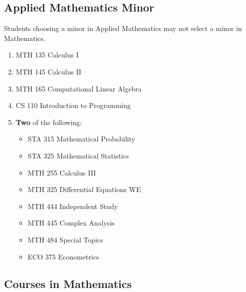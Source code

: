 \documentclass[
  letterpaper,
]{scrbook}
\providecommand{\tightlist}{%
  \setlength{\itemsep}{0pt}\setlength{\parskip}{0pt}}
\begin{document}
\subsection{Applied Mathematics Minor}\label{applied-mathematics-minor}

Students choosing a minor in Applied Mathematics may not select a minor
in Mathematics.

\begin{enumerate}
\def\labelenumi{\arabic{enumi}.}
\tightlist
\item
  MTH 135 Calculus I\\
\item
  MTH 145 Calculus II\\
\item
  MTH 165 Computational Linear Algebra\\
\item
  CS 110 Introduction to Programming\\
\item
  \textbf{Two} of the following:

  \begin{itemize}
  \tightlist
  \item
    STA 315 Mathematical Probability\\
  \item
    STA 325 Mathematical Statistics\\
  \item
    MTH 255 Calculus III\\
  \item
    MTH 325 Differential Equations WE\\
  \item
    MTH 444 Independent Study\\
  \item
    MTH 445 Complex Analysis\\
  \item
    MTH 484 Special Topics\\
  \item
    ECO 375 Econometrics
  \end{itemize}
\end{enumerate}

\subsection{Courses in Mathematics}\label{courses-in-mathematics}
\end{document}
